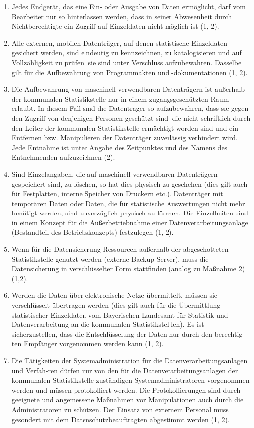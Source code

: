 \begin{enumerate}[label=arabic*.]
            \item Jedes Endgerät, das eine Ein- oder Ausgabe von Daten ermöglicht, darf vom Bearbeiter nur so hinterlassen werden, dass in seiner Abwesenheit durch Nichtberechtigte ein Zugriff auf Einzeldaten nicht möglich ist (1, 2).
            \item Alle externen, mobilen Datenträger, auf denen statistische Einzeldaten gesichert werden, sind eindeutig zu kennzeichnen, zu katalogisieren und auf Vollzähligkeit zu prüfen; sie sind unter Verschluss aufzubewahren. Dasselbe gilt für die Aufbewahrung von Programmakten und -dokumentationen (1, 2).
            \item Die Aufbewahrung von maschinell verwendbaren Datenträgern ist außerhalb der kommunalen Statistikstelle nur in einem zugangsgeschützten Raum erlaubt. In diesem Fall sind die Datenträger so aufzubewahren, dass sie gegen den Zugriff von denjenigen Personen geschützt sind, die nicht schriftlich durch den Leiter der kommunalen Statistikstelle ermächtigt worden sind und ein Entfernen bzw. Manipulieren der Datenträger zuverlässig verhindert wird. Jede Entnahme ist unter Angabe des Zeitpunktes und des Namens des Entnehmenden aufzuzeichnen (2).
            \item Sind Einzelangaben, die auf maschinell verwendbaren Datenträgern gespeichert sind, zu löschen, so hat dies physisch zu geschehen (dies gilt auch für Festplatten, interne Speicher von Druckern etc.). Datenträger mit temporären Daten oder Daten, die für statistische Auswertungen nicht mehr benötigt werden, sind unverzüglich physisch zu löschen. Die Einzelheiten sind in einem Konzept für die Außerbetriebnahme einer Datenverarbeitungsanlage (Bestandteil des Betriebskonzepts) festzulegen (1, 2).
            \item Wenn für die Datensicherung Ressourcen außerhalb der abgeschotteten Statistikstelle genutzt werden (externe Backup-Server), muss die Datensicherung in verschlüsselter Form stattfinden (analog zu Maßnahme 2) (1,2).
            \item Werden die Daten über elektronische Netze übermittelt, müssen sie verschlüsselt übertragen werden (dies gilt auch für die Übermittlung statistischer Einzeldaten vom Bayerischen Landesamt für Statistik und Datenverarbeitung an die kommunalen Statistikstel-len). Es ist sicherzustellen, dass die Entschlüsselung der Daten nur durch den berechtig-ten Empfänger vorgenommen werden kann (1, 2).
            \item Die Tätigkeiten der Systemadministration für die Datenverarbeitungsanlagen und Verfah-ren dürfen nur von den für die Datenverarbeitungsanlagen der kommunalen Statistikstelle zuständigen Systemadministratoren vorgenommen werden und müssen protokolliert werden. Die Protokollierungen sind durch geeignete und angemessene Maßnahmen vor Manipulationen auch durch die Administratoren zu schützen. Der Einsatz von externem Personal muss gesondert mit dem Datenschutzbeauftragten abgestimmt werden (1, 2).

\end{enumerate}

